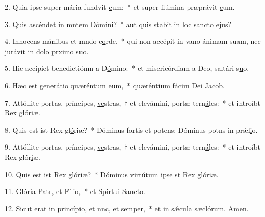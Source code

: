 2. Quia ipse super mária fundvit \uline{e}um:~* et super flúmina præprávit \uline{e}um.\par 
3. Quis ascéndet in mntem D\uline{ó}mini?~* aut quis stabit in loc sancto \uline{e}jus?\par 
4. Innocens mánibus et mndo c\uline{o}rde,~* qui non accépit in vano ánimam suam, nec jurávit in dolo prximo s\uline{u}o.\par 
5. Hic accípiet benedictiónm a D\uline{ó}mino:~* et misericórdiam a Deo, saltári s\uline{u}o.\par 
6. Hæc est generátio quæréntum \uline{e}um,~* quæréntium fácim Dei J\uline{a}cob.\par 
7. Attóllite portas, príncipes, \uline{ve}stras,~† et elevámini, portæ tern\uline{á}les:~* et introíbt Rex glór\uline{i}æ.\par 
8. Quis est ist Rex gl\uline{ó}riæ?~* Dóminus fortis et potens: Dóminus potns in prǽl\uline{i}o.\par 
9. Attóllite portas, príncipes, \uline{ve}stras,~† et elevámini, portæ tern\uline{á}les:~* et introíbt Rex glór\uline{i}æ.\par 
10. Quis est ist Rex gl\uline{ó}riæ?~* Dóminus virtútum ipse st Rex glór\uline{i}æ.\par 
11. Glória Patr, et F\uline{í}lio,~* et Spirtui S\uline{a}ncto.\par 
12. Sicut erat in princípio, et nnc, et s\uline{e}mper,~* et in sǽcula sæclórum. \uline{A}men.\par 
